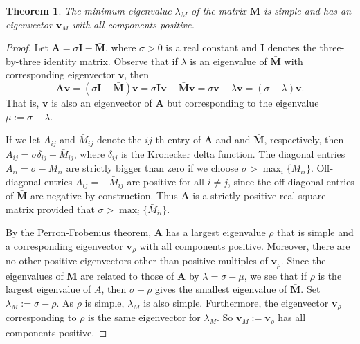 \documentclass[preprint,12pt]{elsarticle}
\newtheorem{theorem}{Theorem}[section]
\newcommand{\M}{\mathbf{M}}
\newcommand{\bv}{\mathbf{v}}
\begin{document}
\begin{theorem}\label{positive_evector} The minimum eigenvalue $\lambda_M$ of the matrix $\bar{\M}$ is simple and has an eigenvector $\bv_M$ with all components positive.
\end{theorem}
\begin{proof} Let $\mathbf{A}=\sigma \mathbf{I}-\bar{\M}$, where $\sigma>0$ is a real constant and $\mathbf{I}$ denotes the three-by-three identity matrix. Observe that if $\lambda$ is an eigenvalue of $\bar{\M}$ with corresponding eigenvector $\bv$, then 
\[
\mathbf{A}\bv=(\sigma \mathbf{I}-\bar{\M})\bv=\sigma \mathbf{I}\bv-\bar{\M}\bv=\sigma \bv-\lambda \bv=(\sigma-\lambda)\bv.
\]
That is, $\bv$ is also an eigenvector of $\mathbf{A}$ but corresponding to the eigenvalue $\mu:=\sigma-\lambda$.

If we let $A_{ij}$ and $\bar M_{ij}$ denote the $ij$-th entry of $\mathbf{A}$ and and $\bar{\M}$, respectively, then $A_{ij}=\sigma \delta_{ij}-\bar{M}_{ij}$, where $\delta_{ij}$ is the Kronecker delta function. The diagonal entries $A_{ii}=\sigma-\bar{M}_{ii}$ are strictly bigger than zero if we choose $\sigma>\max_i \{M_{ii}\}$. Off-diagonal entries $A_{ij}=-\bar{M}_{ij}$ are positive for all $i\neq j$, since the off-diagonal entries of $\bar{\M}$ are negative by construction. Thus $\mathbf{A}$ is a strictly positive real square matrix provided that $\sigma>\max_{i}\{\bar{M}_{ii}\}$. 

By the Perron-Frobenius theorem, $\mathbf{A}$ has a largest eigenvalue $\rho$ that is simple and a corresponding eigenvector $\bv_{\rho}$ with all components positive. Moreover, there are no other positive eigenvectors other than positive multiples of $\bv_{\rho}$. Since the eigenvalues of $\bar{\M}$ are related to those of $\mathbf{A}$ by $\lambda=\sigma - \mu$, we see that if $\rho$ is the largest eigenvalue of $A$, then $\sigma-\rho$ gives the smallest eigenvalue of $\bar{\M}$. Set $\lambda_M:=\sigma-\rho$. As $\rho$ is simple, $\lambda_M$ is also simple. Furthermore, the eigenvector $\bv_\rho$ corresponding to $\rho$ is the same eigenvector for $\lambda_M$. So $\bv_M:=\bv_\rho$ has all components positive.
\end{proof}
\end{document}
